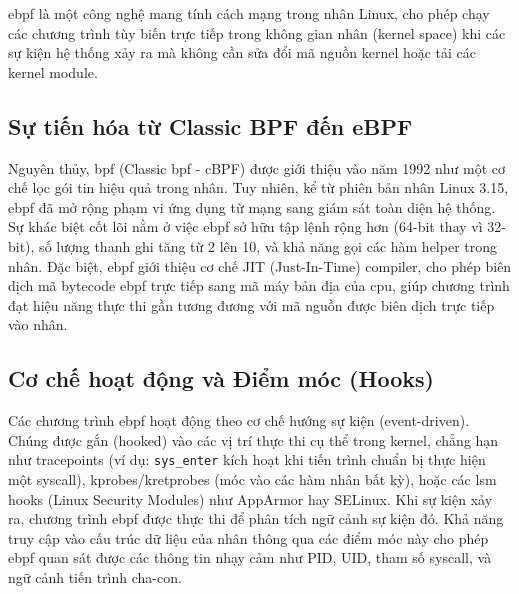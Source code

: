 \documentclass[../main.tex]{subfiles}
\begin{document}
\gls{ebpf} là một công nghệ mang tính cách mạng trong nhân Linux, cho phép
chạy các chương trình tùy biến trực tiếp trong không gian nhân
(kernel space) khi các sự kiện hệ thống xảy ra mà không cần sửa đổi
mã nguồn kernel hoặc tải các kernel module.

\subsection{Sự tiến hóa từ Classic BPF đến eBPF}
Nguyên thủy, \gls{bpf} (Classic \gls{bpf} - cBPF) được giới thiệu vào năm 1992
\cite{mccanne1993bpf} như một cơ chế lọc gói tin hiệu quả trong nhân. Tuy nhiên, kể từ
phiên bản nhân Linux 3.15, \gls{ebpf} đã mở rộng phạm vi ứng dụng từ mạng
sang giám sát toàn diện hệ thống. Sự khác biệt cốt lõi nằm ở việc
\gls{ebpf} sở hữu tập lệnh rộng hơn (64-bit thay vì 32-bit), số lượng thanh
ghi tăng từ 2 lên 10, và khả năng gọi các hàm helper trong nhân. Đặc
biệt, \gls{ebpf} giới thiệu cơ chế JIT (Just-In-Time) compiler, cho phép
biên dịch mã bytecode \gls{ebpf} trực tiếp sang mã máy bản địa của \gls{cpu},
giúp chương trình đạt hiệu năng thực thi gần tương đương với mã nguồn
được biên dịch trực tiếp vào nhân.

\subsection{Cơ chế hoạt động và Điểm móc (Hooks)}
Các chương trình \gls{ebpf} hoạt động theo cơ chế hướng sự kiện
(event-driven). Chúng được gắn (hooked) vào các vị trí thực thi cụ
thể trong kernel, chẳng hạn như tracepoints (ví dụ:
  \texttt{sys\_enter} kích hoạt khi tiến trình chuẩn bị thực hiện một
\gls{syscall}), kprobes/kretprobes (móc vào các hàm nhân bất kỳ), hoặc các
\gls{lsm} hooks (Linux Security Modules) như AppArmor hay SELinux. Khi sự
kiện xảy ra, chương trình \gls{ebpf} được thực thi để phân tích ngữ cảnh sự
kiện đó. Khả năng truy cập vào cấu trúc dữ liệu của nhân thông qua
các điểm móc này cho phép \gls{ebpf} quan sát được các thông tin nhạy cảm
như PID, UID, tham số \gls{syscall}, và ngữ cảnh tiến trình cha-con.
\end{document}
